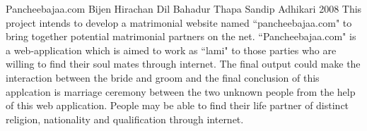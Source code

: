  \begin{conf-abstract}[]
{Pancheebajaa.com}
{
Bijen Hirachan
Dil Bahadur Thapa
Sandip Adhikari
}
{2008}
	This project intends to develop a matrimonial website named ``pancheebajaa.com" to bring together
potential matrimonial partners on the net. ``Pancheebajaa.com" is a web-application which is aimed to work
as ``lami" to those parties who are willing to find their soul mates through internet. The final output 
could make the interaction between the bride and groom and the final conclusion of this applcation is marriage
ceremony between the two unknown people from the help of this web application. People may be able to find their
life partner of distinct religion, nationality and qualification through internet.
  \end{conf-abstract}